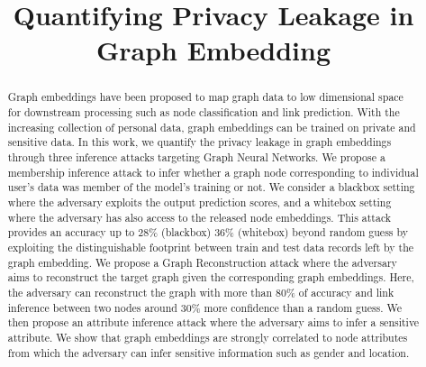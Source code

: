 \documentclass[sigconf]{acmart}
\begin{document}

\title{Quantifying Privacy Leakage in Graph Embedding}







\begin{abstract}


Graph embeddings have been proposed to map graph data to low dimensional space for downstream processing such as node classification and link prediction. With the increasing collection of personal data, graph embeddings can be trained on private and sensitive data. In this work, we quantify the privacy leakage in graph embeddings through three inference attacks targeting Graph Neural Networks. We propose a membership inference attack to infer whether a graph node corresponding to individual user's data was member of the model's training or not. We consider a blackbox setting where the adversary exploits the output prediction scores, and a whitebox setting where the adversary has also access to the released node embeddings. This attack provides an accuracy up to 28\% (blackbox) 36\% (whitebox) beyond random guess by exploiting the distinguishable footprint between train and test data records left by the graph embedding. We propose a Graph Reconstruction attack where the adversary aims to reconstruct the target graph given the corresponding graph embeddings. Here, the adversary can reconstruct the graph with more than 80\% of accuracy and link inference between two nodes around 30\% more confidence than a random guess. We then propose an attribute inference attack where the adversary aims to infer a sensitive attribute. We show that graph embeddings are strongly correlated to node attributes from which the adversary can infer sensitive information such as gender and location.










\end{abstract}
\end{document}
